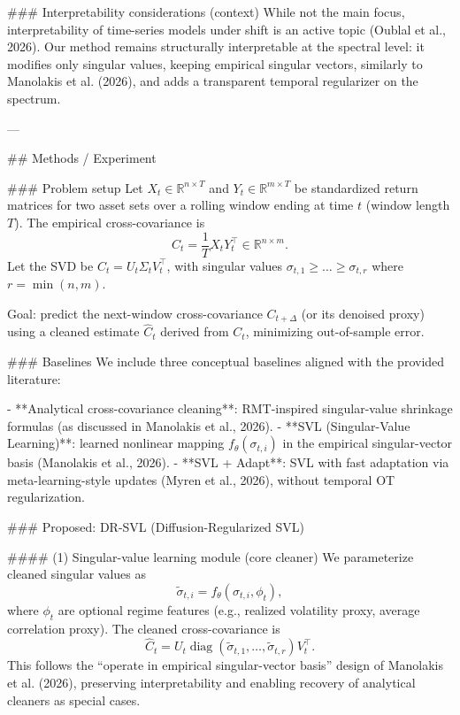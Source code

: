### Interpretability considerations (context)  
While not the main focus, interpretability of time-series models under shift is an active topic (Oublal et al., 2026). Our method remains structurally interpretable at the spectral level: it modifies only singular values, keeping empirical singular vectors, similarly to Manolakis et al. (2026), and adds a transparent temporal regularizer on the spectrum.

---

## Methods / Experiment  

### Problem setup  
Let \(X_t \in \mathbb{R}^{n\times T}\) and \(Y_t \in \mathbb{R}^{m\times T}\) be standardized return matrices for two asset sets over a rolling window ending at time \(t\) (window length \(T\)). The empirical cross-covariance is  
\[
C_t = \frac{1}{T} X_t Y_t^\top \in \mathbb{R}^{n\times m}.
\]
Let the SVD be \(C_t = U_t \Sigma_t V_t^\top\), with singular values \(\sigma_{t,1}\ge \dots \ge \sigma_{t,r}\) where \(r=\min(n,m)\).

Goal: predict the next-window cross-covariance \(C_{t+\Delta}\) (or its denoised proxy) using a cleaned estimate \(\widehat{C}_t\) derived from \(C_t\), minimizing out-of-sample error.

### Baselines  
We include three conceptual baselines aligned with the provided literature:

- **Analytical cross-covariance cleaning**: RMT-inspired singular-value shrinkage formulas (as discussed in Manolakis et al., 2026).  
- **SVL (Singular-Value Learning)**: learned nonlinear mapping \(f_\theta(\sigma_{t,i})\) in the empirical singular-vector basis (Manolakis et al., 2026).  
- **SVL + Adapt**: SVL with fast adaptation via meta-learning-style updates (Myren et al., 2026), without temporal OT regularization.

### Proposed: DR-SVL (Diffusion-Regularized SVL)  

#### (1) Singular-value learning module (core cleaner)  
We parameterize cleaned singular values as  
\[
\tilde{\sigma}_{t,i} = f_\theta(\sigma_{t,i}, \phi_t),
\]
where \(\phi_t\) are optional regime features (e.g., realized volatility proxy, average correlation proxy). The cleaned cross-covariance is  
\[
\widehat{C}_t = U_t \operatorname{diag}(\tilde{\sigma}_{t,1},\dots,\tilde{\sigma}_{t,r}) V_t^\top.
\]
This follows the “operate in empirical singular-vector basis” design of Manolakis et al. (2026), preserving interpretability and enabling recovery of analytical cleaners as special cases.

